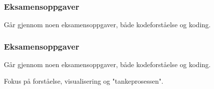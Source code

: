 
\begin{frame}
    \frametitle{Eksamensoppgaver}

    Går gjennom noen eksamensoppgaver, både kodeforståelse og koding. 

\end{frame}

\begin{frame}
    \frametitle{Eksamensoppgaver}

    Går gjennom noen eksamensoppgaver, både kodeforståelse og koding. 
    
    Fokus på forståelse, visualisering og "tankeprosessen". 

\end{frame}

